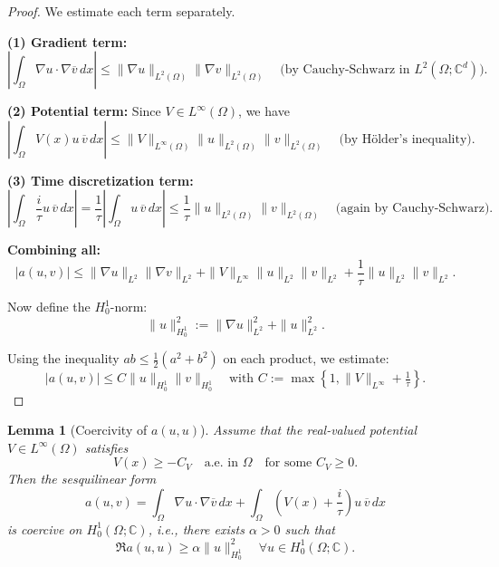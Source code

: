 \documentclass{article}
\theoremstyle{definition}
\theoremstyle{plain}
\newtheorem{lemma}[definition]{Lemma}
\theoremstyle{remark}
\begin{document}
\begin{proof}
We estimate each term separately.

\textbf{(1) Gradient term:}
\[
\left| \int_\Omega \nabla u \cdot \nabla \overline{v} \, dx \right| \leq \|\nabla u\|_{L^2(\Omega)} \|\nabla v\|_{L^2(\Omega)}
\quad \text{(by Cauchy-Schwarz in } L^2(\Omega; \mathbb{C}^d) \text{)}.
\]

\textbf{(2) Potential term:}
Since $V \in L^\infty(\Omega)$, we have
\[
\left| \int_\Omega V(x) u \, \overline{v} \, dx \right|
\leq \|V\|_{L^\infty(\Omega)} \|u\|_{L^2(\Omega)} \|v\|_{L^2(\Omega)}
\quad \text{(by Hölder's inequality)}.
\]

\textbf{(3) Time discretization term:}
\[
\left| \int_\Omega \frac{i}{\tau} u \, \overline{v} \, dx \right|
= \frac{1}{\tau} \left| \int_\Omega u \, \overline{v} \, dx \right|
\leq \frac{1}{\tau} \|u\|_{L^2(\Omega)} \|v\|_{L^2(\Omega)}
\quad \text{(again by Cauchy-Schwarz)}.
\]

\textbf{Combining all:}
\[
|a(u, v)| \leq \|\nabla u\|_{L^2} \|\nabla v\|_{L^2}
+ \|V\|_{L^\infty} \|u\|_{L^2} \|v\|_{L^2}
+ \frac{1}{\tau} \|u\|_{L^2} \|v\|_{L^2}.
\]

Now define the $H_0^1$-norm:
\[
\|u\|_{H_0^1}^2 := \|\nabla u\|_{L^2}^2 + \|u\|_{L^2}^2.
\]

Using the inequality $ab \leq \tfrac{1}{2}(a^2 + b^2)$ on each product, we estimate:
\[
|a(u, v)| \leq C \|u\|_{H_0^1} \|v\|_{H_0^1}
\quad \text{with } C := \max\left\{1, \|V\|_{L^\infty} + \tfrac{1}{\tau} \right\}.
\]
\end{proof}


\begin{lemma}[Coercivity of $a(u, u)$]
Assume that the real-valued potential $V \in L^\infty(\Omega)$ satisfies
\[
V(x) \geq -C_V \quad \text{a.e. in } \Omega \quad \text{for some } C_V \geq 0.
\]
Then the sesquilinear form
\[
a(u, v) = \int_\Omega \nabla u \cdot \nabla \overline{v} \, dx + \int_\Omega \left(V(x) + \frac{i}{\tau} \right) u \, \overline{v} \, dx
\]
is coercive on $H_0^1(\Omega; \mathbb{C})$, i.e., there exists $\alpha > 0$ such that
\[
\Re a(u, u) \geq \alpha \|u\|_{H_0^1}^2 \quad \forall u \in H_0^1(\Omega; \mathbb{C}).
\]
\end{lemma}
\end{document}
